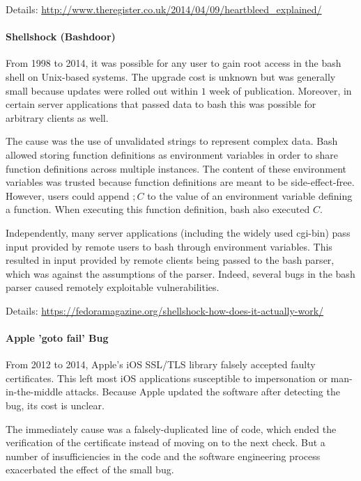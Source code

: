 Details: \url{http://www.theregister.co.uk/2014/04/09/heartbleed_explained/}

\paragraph{Shellshock (Bashdoor)}
From 1998 to 2014, it was possible for any user to gain root access in the bash shell on Unix-based systems.
The upgrade cost is unknown but was generally small because updates were rolled out within $1$ week of publication.
Moreover, in certain server applications that passed data to bash this was possible for arbitrary clients as well.

The cause was the use of unvalidated strings to represent complex data.
Bash allowed storing function definitions as environment variables in order to share function definitions across multiple instances.
The content of these environment variables was trusted because function definitions are meant to be side-effect-free.
However, users could append $; C$ to the value of an environment variable defining a function.
When executing this function definition, bash also executed $C$.


Independently, many server applications (including the widely used cgi-bin) pass input provided by remote users to bash through environment variables.
This resulted in input provided by remote clients being passed to the bash parser, which was against the assumptions of the parser.
Indeed, several bugs in the bash parser caused remotely exploitable vulnerabilities.

Details: \url{https://fedoramagazine.org/shellshock-how-does-it-actually-work/}

\paragraph{Apple 'goto fail' Bug}
From 2012 to 2014, Apple's iOS SSL/TLS library falsely accepted faulty certificates.
This left most iOS applications susceptible to impersonation or man-in-the-middle attacks.
Because Apple updated the software after detecting the bug, its cost is unclear.

The immediately cause was a falsely-duplicated line of code, which ended the verification of the certificate instead of moving on to the next check.
But a number of insufficiencies in the code and the software engineering process exacerbated the effect of the small bug.

